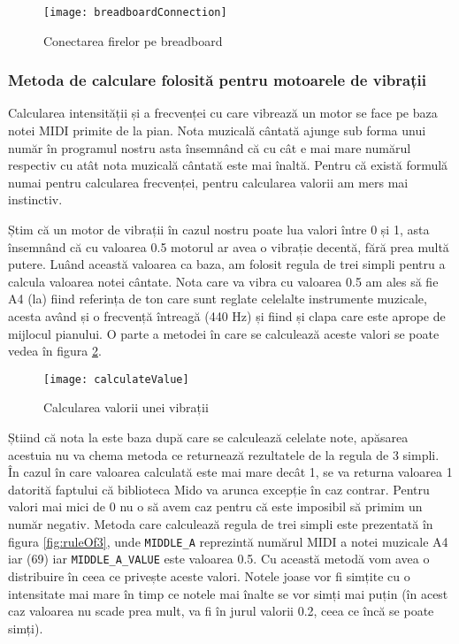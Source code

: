 \documentclass[../IoMusT.tex]{subfiles}
\begin{document}
\begin{figure}[h]
\centering
\texttt{[image: breadboardConnection]}
\caption{Conectarea firelor pe breadboard}
\label{fig:breadboardConnection}
\end{figure}  
\newpage
\subsubsection{Metoda de calculare folosită pentru motoarele de vibrații}
Calcularea intensității și a frecvenței cu care vibrează un motor se face pe baza notei MIDI primite de la pian. Nota muzicală cântată ajunge sub forma unui număr în programul nostru asta însemnând că cu cât e mai mare numărul respectiv cu atât nota muzicală cântată este mai înaltă. Pentru că există formulă numai pentru calcularea frecvenței, pentru calcularea valorii am mers mai instinctiv.
\\
\par Știm că un motor de vibrații în cazul nostru poate lua valori între 0 și 1, asta însemnând că cu valoarea 0.5 motorul ar avea o vibrație decentă, fără prea multă putere. Luând această valoarea ca baza, am folosit regula de trei simpli pentru a calcula valoarea notei cântate. Nota care va vibra cu valoarea 0.5 am ales să fie A4 (la) fiind referința de ton care sunt reglate celelalte instrumente muzicale, acesta având și o frecvență întreagă (440 Hz) și fiind și clapa care este aprope de mijlocul pianului. O parte a metodei în care se calculează aceste valori se poate vedea în figura \ref{fig:calculateValue}.
\begin{figure}[h]
\centering
\texttt{[image: calculateValue]}
\caption{Calcularea valorii unei vibrații}
\label{fig:calculateValue}
\end{figure}  
 Știind că nota la este baza după care se calculează celelate note, apăsarea acestuia nu va chema metoda ce returnează rezultatele de la regula de 3 simpli. În cazul în care valoarea calculată este mai mare decât 1, se va returna valoarea 1 datorită faptului că biblioteca Mido va arunca excepție în caz contrar. Pentru valori mai mici de 0 nu o să avem caz pentru că este imposibil să primim un număr negativ. Metoda care calculează regula de trei simpli este prezentată în figura \ref{fig:ruleOf3}, unde \verb|MIDDLE_A| reprezintă numărul MIDI a notei muzicale A4 iar (69) iar \verb|MIDDLE_A_VALUE| este valoarea 0.5. Cu această metodă vom avea o distribuire în ceea ce privește aceste valori. Notele joase vor fi simțite cu o intensitate mai mare în timp ce notele mai înalte se vor simți mai puțin (în acest caz valoarea nu scade prea mult, va fi în jurul valorii 0.2, ceea ce încă se poate simți).
\end{document}
